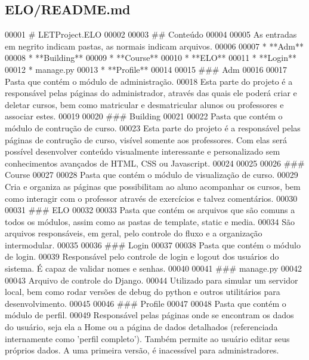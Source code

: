 \hypertarget{ELO_2README_8md_source}{\subsection{E\-L\-O/\-R\-E\-A\-D\-M\-E.md}
}

\begin{DoxyCode}
00001 \textcolor{preprocessor}{# LETProject.ELO}
00002 \textcolor{preprocessor}{}
00003 \textcolor{preprocessor}{## Conteúdo}
00004 \textcolor{preprocessor}{}
00005 As entradas em negrito indicam pastas, as normais indicam arquivos.
00006 
00007 * **Adm**
00008 * **Building**
00009 * **Course**
00010 * **ELO**
00011 * **Login**
00012 * manage.py
00013 * **Profile**
00014 
00015 \textcolor{preprocessor}{### Adm}
00016 \textcolor{preprocessor}{}
00017 Pasta que contém o módulo de administração.
00018 Esta parte \textcolor{keywordflow}{do} projeto é a responsável pelas páginas \textcolor{keywordflow}{do} administrador, através das quais ele poderá criar e 
      deletar cursos, bem como matricular e desmatricular alunos ou professores e associar estes.
00019 
00020 ### Building
00021 
00022 Pasta que contém o módulo de contrução de curso.
00023 Esta parte \textcolor{keywordflow}{do} projeto é a responsável pelas páginas de contrução de curso, visível somente aos professores.
       Com elas será possível desenvolver conteúdo visualmente interessante e personalizado sem conhecimentos 
      avançados de HTML, CSS ou Javascript.
00024 
00025 
00026 ### Course
00027 
00028 Pasta que contém o módulo de visualização de curso.
00029 Cria e organiza as páginas que possibilitam ao aluno acompanhar os cursos, bem como interagir com o 
      professor através de exercícios e talvez comentários.
00030 
00031 ### ELO
00032 
00033 Pasta que contém os arquivos que são comuns a todos os módulos, assim como as pastas de \textcolor{keyword}{template}, \textcolor{keyword}{static} e 
      media.
00034 São arquivos responsáveis, em geral, pelo controle \textcolor{keywordflow}{do} fluxo e a organização intermodular.
00035 
00036 ### Login
00037 
00038 Pasta que contém o módulo de login.
00039 Responsável pelo controle de login e logout dos usuários \textcolor{keywordflow}{do} sistema. É capaz de validar nomes e senhas.
00040 
00041 ### manage.py
00042 
00043 Arquivo de controle \textcolor{keywordflow}{do} Django.
00044 Utilizado para simular um servidor local, bem como rodar versões de debug \textcolor{keywordflow}{do} python e outros utilitários 
      para desenvolvimento.
00045 
00046 ### Profile
00047 
00048 Pasta que contém o módulo de perfil.
00049 Responsável pelas páginas onde se encontram os dados \textcolor{keywordflow}{do} usuário, seja ela a Home ou a página de dados 
      detalhados (referenciada internamente como \textcolor{stringliteral}{'perfil completo'}). Também permite ao usuário editar seus próprios 
      dados. A uma primeira versão, é inacessível para administradores.
\end{DoxyCode}
